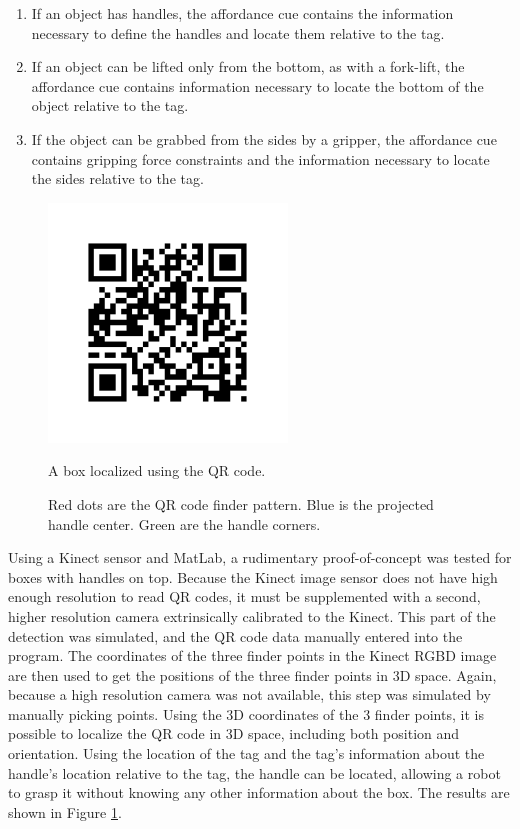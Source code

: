 \documentclass[]{cwru} %
\begin{document}
\begin{enumerate}
\def\labelenumi{\arabic{enumi}.}
\item
  If an object has handles, the affordance cue contains the information
  necessary to define the handles and locate them relative to the tag.
\item
  If an object can be lifted only from the bottom, as with a fork-lift,
  the affordance cue contains information necessary to locate the bottom
  of the object relative to the tag.
\item
  If the object can be grabbed from the sides by a gripper, the
  affordance cue contains gripping force constraints and the information
  necessary to locate the sides relative to the tag.
\end{enumerate}

\begin{figure}[ht]
\centering
\includegraphics[height=2.5in]{Qr-3}
\caption{A box localized using the QR code.}
\caption*{Red dots are the QR code finder pattern. Blue is the projected 
handle center. Green are the handle corners.}
\label{fig:qr_box}
\end{figure}

Using a Kinect sensor and MatLab, a rudimentary proof-of-concept was
tested for boxes with handles on top. Because the Kinect image sensor
does not have high enough resolution to read QR codes, it must be
supplemented with a second, higher resolution camera extrinsically
calibrated to the Kinect. This part of the detection was simulated, and
the QR code data manually entered into the program. The coordinates of
the three finder points in the Kinect RGBD image are then used to get
the positions of the three finder points in 3D space. Again, because a
high resolution camera was not available, this step was simulated by
manually picking points. Using the 3D coordinates of the 3 finder
points, it is possible to localize the QR code in 3D space, including
both position and orientation. Using the location of the tag and the
tag's information about the handle's location relative to the tag, the
handle can be located, allowing a robot to grasp it without knowing any
other information about the box. The results are shown in Figure 
\ref{fig:qr_box}.
\end{document}
